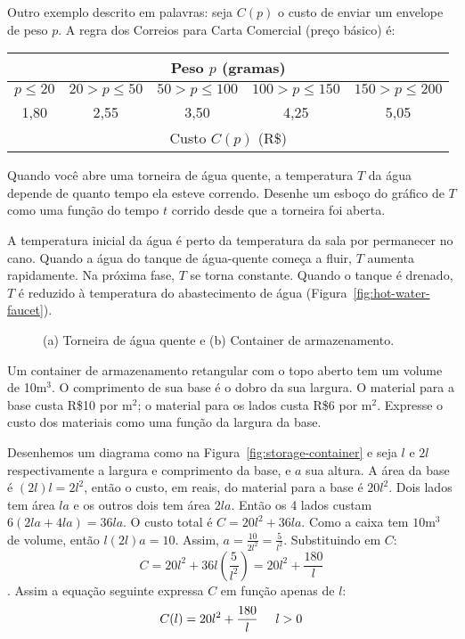 Outro exemplo descrito em palavras: seja $C(p)$ o custo de enviar um envelope de peso $p$. A regra dos Correios para Carta Comercial (preço básico) é: 
\vspace{-0.3cm}\begin{table}[!ht]
  \setlength\tabcolsep{0.04cm}
  \centering
	\begin{tabular}{|c|c|c|c|c|}\hline
    \multicolumn{5}{|c|}{Peso $p$ (gramas)}\\\hline
		$p \leq 20$ & $20 > p \leq 50$ & $50 > p \leq 100$ & $100 > p \leq 150$ & $150 > p \leq 200$\\\hline
		1,80&2,55&3,50&4,25&5,05\\\hline
    \multicolumn{5}{|c|}{Custo $C(p)$ (R\$)}\\\hline
	\end{tabular}
  \vspace{-0.5cm}
\end{table}

 Quando você abre uma torneira de água quente, a temperatura $T$ da água depende de quanto tempo ela esteve correndo. Desenhe um esboço do gráfico de $T$ como uma função do tempo $t$ corrido desde que a torneira foi aberta.

\solution A temperatura inicial da água é perto da temperatura da sala por permanecer no cano. Quando a água do tanque de água-quente começa a fluir, $T$ aumenta rapidamente. Na próxima fase, $T$ se torna constante. Quando o tanque é drenado, $T$ é reduzido à temperatura do abastecimento de água (Figura~\ref{fig:hot-water-faucet}).

\begin{figure}[!ht]
  \centering
  \caption{(a) Torneira de água quente e (b) Container de armazenamento.}
  \vspace{-0.5cm}
\end{figure}
\vspace{-0.3cm}
\exampleEnd
{} Um container de armazenamento retangular com o topo aberto tem um volume de 10$\si\meter^3$. O comprimento de sua base é o dobro da sua largura. O material para a base custa R\$10 por $\si{\meter}^2$; o material para os lados custa R\$6 por $\si{\meter}^2$. Expresse o custo dos materiais como uma função da largura da base.

\solution Desenhemos um diagrama como na Figura~\ref{fig:storage-container} e seja $l$ e $2l$ respectivamente a largura e comprimento da base, e $a$ sua altura. A área da base é $(2l)l=2l^2$, então o custo, em reais, do material para a base é $20l^2$. Dois lados tem área $la$ e os outros dois tem área $2la$. Então os 4 lados custam $6(2la + 4la)=36la$. O custo total é $C=20l^2+36la$. Como a caixa tem $10\si\meter^3$ de volume, então $l(2l)a = 10$. Assim, $\displaystyle a=\frac{10}{2l^2}=\frac{5}{l^2}$. Substituindo em $C$: $$C = 20l^2+36l\left(\frac{5}{l^2}\right) = 20l^2+\frac{180}{l}$$.
Assim a equação seguinte expressa $C$ em função apenas de $l$:
$$C(l)=20l^2+\frac{180}{l}\hspace{0.5cm} l > 0$$
\vspace{-0.6cm}


